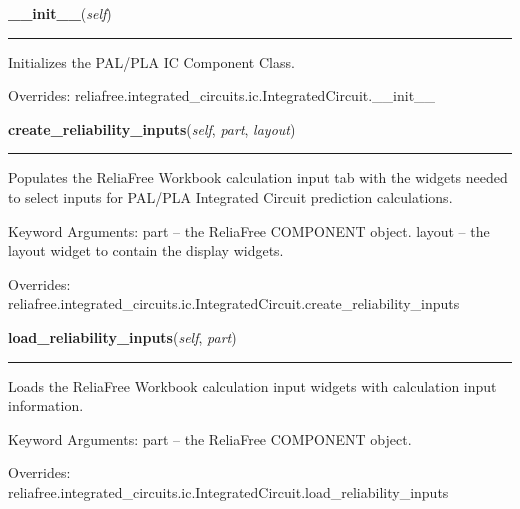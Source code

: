 \hspace{.8\funcindent}\begin{boxedminipage}{\funcwidth}

    \raggedright \textbf{\_\_init\_\_}(\textit{self})

    \vspace{-1.5ex}

    \rule{\textwidth}{0.5\fboxrule}
\setlength{\parskip}{2ex}
    Initializes the PAL/PLA IC Component Class.

\setlength{\parskip}{1ex}
      Overrides: reliafree.integrated\_circuits.ic.IntegratedCircuit.\_\_init\_\_

    \end{boxedminipage}

    \vspace{0.5ex}

\hspace{.8\funcindent}\begin{boxedminipage}{\funcwidth}

    \raggedright \textbf{create\_reliability\_inputs}(\textit{self}, \textit{part}, \textit{layout})

    \vspace{-1.5ex}

    \rule{\textwidth}{0.5\fboxrule}
\setlength{\parskip}{2ex}
    Populates the ReliaFree Workbook calculation input tab with the widgets
    needed to select inputs for PAL/PLA Integrated Circuit prediction 
    calculations.

    Keyword Arguments: part   -- the ReliaFree COMPONENT object. layout -- 
    the layout widget to contain the display widgets.

\setlength{\parskip}{1ex}
      Overrides: reliafree.integrated\_circuits.ic.IntegratedCircuit.create\_reliability\_inputs

    \end{boxedminipage}

    \vspace{0.5ex}

\hspace{.8\funcindent}\begin{boxedminipage}{\funcwidth}

    \raggedright \textbf{load\_reliability\_inputs}(\textit{self}, \textit{part})

    \vspace{-1.5ex}

    \rule{\textwidth}{0.5\fboxrule}
\setlength{\parskip}{2ex}
    Loads the ReliaFree Workbook calculation input widgets with calculation
    input information.

    Keyword Arguments: part -- the ReliaFree COMPONENT object.

\setlength{\parskip}{1ex}
      Overrides: reliafree.integrated\_circuits.ic.IntegratedCircuit.load\_reliability\_inputs

    \end{boxedminipage}

